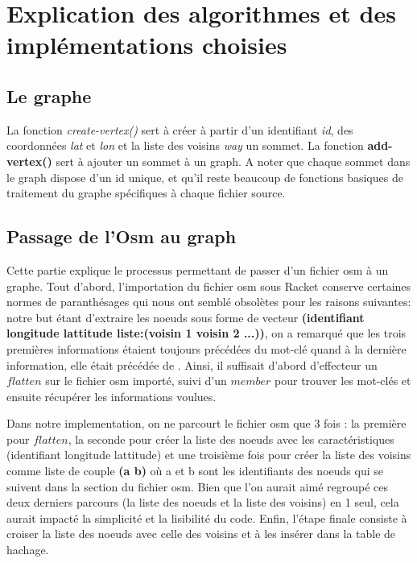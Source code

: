 \documentclass[french]{article}
\begin{document}
\section{Explication des algorithmes et des implémentations choisies}
\subsection{Le graphe} 
La fonction \textit{{c}reate-vertex()} sert à créer à partir d'un identifiant \textit{id}, des coordonnées \textit{lat} et \textit{lon} et la liste des voisins \textit{way} un sommet. La fonction \textbf{add-vertex()} sert à ajouter un sommet à un graph. A noter que chaque sommet dans le graph dispose d'un id unique, et qu'il reste beaucoup de fonctions basiques de traitement du graphe spécifiques à chaque fichier source.
\subsection{Passage de l'Osm au graph} 
Cette partie explique le processus permettant de passer d'un fichier osm à un graphe. Tout d'abord, l'importation du fichier osm sous Racket conserve certaines normes de paranthésages qui nous ont semblé obsolètes pour les raisons suivantes: notre but étant d'extraire les noeuds sous forme de vecteur \textbf{(identifiant longitude lattitude liste:(voisin 1 voisin 2 ...))}, on a remarqué que les trois premières informations étaient toujours précédées du mot-clé  quand à la dernière information, elle était précédée de . Ainsi, il suffisait d'abord d'effecteur un $flatten$ sur le fichier osm importé, suivi d'un $member$ pour trouver les mot-clés et ensuite récupérer les informations voulues.\newline

Dans notre implementation, on ne parcourt le fichier osm que 3 fois : la première pour $flatten$, la seconde pour créer la liste des noeuds avec les caractéristiques (identifiant longitude lattitude) et une troisième fois pour créer la liste des voisins comme liste de couple \textbf{(a b)} où a et b sont les identifiants des noeuds qui se suivent dans la section  du fichier osm. Bien que l'on aurait aimé regroupé ces deux derniers parcours (la liste des noeuds et la liste des voisins) en 1 seul, cela aurait impacté la simplicité et la lisibilité du code. 
\newline Enfin, l'étape finale consiste à croiser la liste des noeuds avec celle des voisins et à les insérer dans la table de hachage.\newline 
\end{document}
